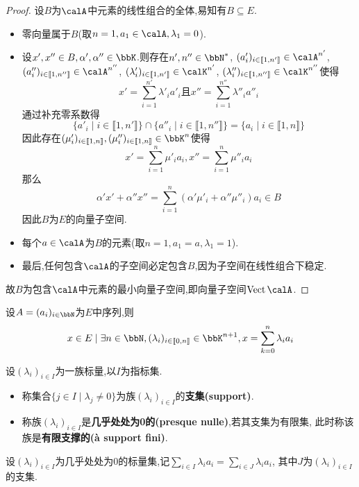 \begin{proof}
    设$B$为$\calA$中元素的线性组合的全体,易知有$B \subseteq E$.

    \begin{itemize}
        \item 零向量属于$B$(取$n = 1, a_1 \in \calA, \lambda_1 = 0$).
        \item 设$x', x'' \in B, \alpha', \alpha'' \in \bbK$.则存在$n', n'' \in \bbN^*$,
            $(a'_i)_{i \in \llbracket 1, n' \rrbracket} \in \calA^{n'}$,
            $(a''_i)_{i \in \llbracket 1, n'' \rrbracket} \in \calA^{n''}$,
            $(\lambda'_i)_{i \in \llbracket 1, n' \rrbracket} \in \calK^{n'}$,
            $(\lambda''_i)_{i\in \llbracket 1, n'' \rrbracket} \in \calK^{n''}$使得
            \[ x' = \sum\limits_{i = 1}^{n'} \lambda'_i a'_i \text{且} x'' = \sum\limits_{i = 1}^{n''} \lambda''_i a''_i \]
            通过补充零系数得\[ \{ a'_i \mid i \in \llbracket 1, n' \rrbracket \} \cap
            \{ a''_i \mid i \in \llbracket 1, n'' \rrbracket \} = \{ a_i \mid i \in \llbracket 1, n \rrbracket \} \]
            因此存在$(\mu'_i)_{i \in \llbracket 1, n \rrbracket}, (\mu''_i)_{i \in \llbracket 1, n \rrbracket} \in \bbK^n$使得
            \[ x' = \sum\limits_{i = 1}^n \mu'_i  a_i, x'' = \sum\limits_{i = 1}^n \mu''_i a_i \]
            那么\[ \alpha' x' + \alpha'' x'' = \sum\limits_{i = 1}^n (\alpha' \mu'_i + \alpha'' \mu''_i) a_i \in B \]
            因此$B$为$E$的向量子空间.
        \item 每个$a \in \calA$为$B$的元素(取$n = 1, a_1 = a, \lambda_1 = 1$).
        \item 最后,任何包含$\calA$的子空间必定包含$B$,因为子空间在线性组合下稳定.
    \end{itemize}

    故$B$为包含$\calA$中元素的最小向量子空间,即向量子空间$\vect \calA$.
\end{proof}

\begin{prop}
    设$A = (a_i)_{i \in \bbN}$为$E$中序列,则\[ x \in E \mid \exists n \in \bbN, (\lambda_i)_{i \in \llbracket 0, n \rrbracket}
    \in \bbK^{n + 1}, x = \sum\limits_{k = 0}^n \lambda_i a_i \]
\end{prop}

\begin{deff}
    设$(\lambda_i)_{i \in I}$为一族标量,以$I$为指标集.
    \begin{itemize}
        \item 称集合$\{ j \in I \mid \lambda_j \neq 0 \}$为族$(\lambda_i)_{i \in I}$的\textbf{支集(support)}.
        \item 称族$(\lambda_i)_{i \in I}$是\textbf{几乎处处为0的(presque nulle)},若其支集为有限集,
            此时称该族是\textbf{有限支撑的(à support fini)}.
    \end{itemize}
\end{deff}

\begin{deff}
    设$(\lambda_i)_{i \in I}$为几乎处处为0的标量集,记$\sum\limits_{i \in I} \lambda_ia_i = \sum\limits_{i \in J} \lambda_ia_i$,
    其中$J$为$(\lambda_i)_{i \in I}$的支集.
\end{deff}